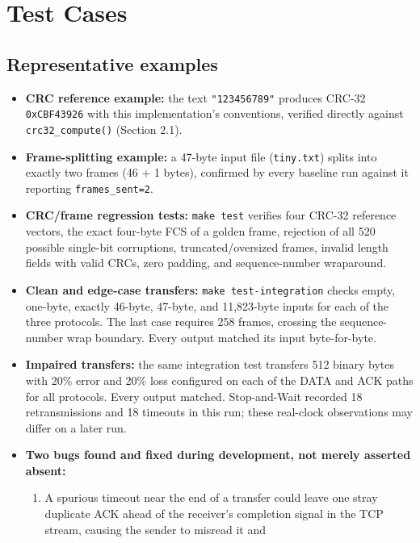 \documentclass[11pt]{article}
\begin{document}
\section{Test Cases}

\subsection{Representative examples}
\begin{itemize}[nosep]
    \item \textbf{CRC reference example:} the text \texttt{"123456789"} produces CRC-32
          \texttt{0xCBF43926} with this implementation's conventions, verified directly against
          \texttt{crc32\_compute()} (Section 2.1).
    \item \textbf{Frame-splitting example:} a 47-byte input file (\texttt{tiny.txt}) splits into exactly
          two frames (46 + 1 bytes), confirmed by every baseline run against it reporting
          \texttt{frames\_sent=2}.
    \item \textbf{CRC/frame regression tests:} \texttt{make test} verifies four CRC-32 reference
          vectors, the exact four-byte FCS of a golden frame, rejection of all 520 possible
          single-bit corruptions, truncated/oversized frames, invalid length fields with valid CRCs,
          zero padding, and sequence-number wraparound.
    \item \textbf{Clean and edge-case transfers:} \texttt{make test-integration} checks empty,
          one-byte, exactly 46-byte, 47-byte, and 11,823-byte inputs for each of the three protocols.
          The last case requires 258 frames, crossing the sequence-number wrap boundary.
          Every output matched its input byte-for-byte.
    \item \textbf{Impaired transfers:} the same integration test transfers 512 binary bytes with
          20\% error and 20\% loss configured on each of the DATA and ACK paths for all protocols.
          Every output matched. Stop-and-Wait recorded 18 retransmissions and 18 timeouts in this run;
          these real-clock observations may differ on a later run.
    \item \textbf{Two bugs found and fixed during development, not merely asserted absent:}
          \begin{enumerate}[nosep]
              \item A spurious timeout near the end of a transfer could leave one stray duplicate ACK ahead
                    of the receiver's completion signal in the TCP stream, causing the sender to misread it and

\end{enumerate}
\end{itemize}
\end{document}
